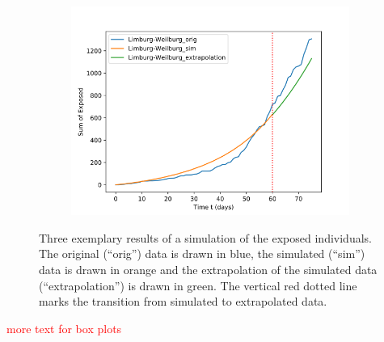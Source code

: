 \begin{figure}
\begin{subfigure}[b]{0.3\textwidth}
		\caption{}
	\end{subfigure}
	\hfill
	\begin{subfigure}[b]{0.3\textwidth}
		\centering
		\includegraphics[width=\textwidth]{./figures/60d/10_Limburg-Weilburg.png}	
		\caption{}
	\end{subfigure}
	\caption{Three exemplary results of a simulation of the exposed individuals. The original (``orig'') data is drawn in blue,
		the simulated (``sim'') data is drawn in orange and the extrapolation of the simulated data (``extrapolation'') is
		drawn in green. The vertical red dotted line marks the transition from simulated to extrapolated data.
		}
	\label{fig:60_sim_expl}
\end{figure}



\textcolor{red}{more text for box plots}



